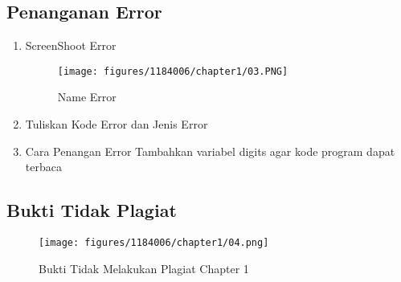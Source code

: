 	\subsection{Penanganan Error}
\begin{enumerate}
	\item ScreenShoot Error
	\begin{figure}[h]
		\texttt{[image: figures/1184006/chapter1/03.PNG]}
		\centering
		\caption{Name Error}
	\end{figure}
	\newpage\item Tuliskan Kode Error dan Jenis Error
	\hfill\break
	
\hfill\break
	\item Cara Penangan Error
\hfill\break Tambahkan variabel digits agar kode program dapat terbaca
	\end{enumerate}
	\subsection{Bukti Tidak Plagiat}
\begin{figure}[h]
	\texttt{[image: figures/1184006/chapter1/04.png]}
	\centering
	\caption{Bukti Tidak Melakukan Plagiat Chapter 1}
\end{figure}